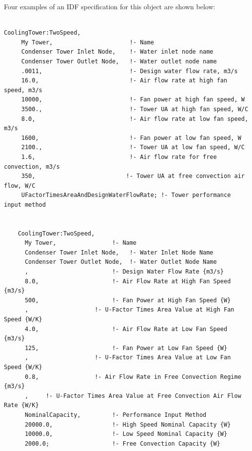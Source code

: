 Four examples of an IDF specification for this object are shown below:

\begin{lstlisting}

CoolingTower:TwoSpeed,
     My Tower,                      !- Name
     Condenser Tower Inlet Node,    !- Water inlet node name
     Condenser Tower Outlet Node,   !- Water outlet node name
     .0011,                         !- Design water flow rate, m3/s
     16.0,                          !- Air flow rate at high fan speed, m3/s
     10000,                         !- Fan power at high fan speed, W
     3500.,                         !- Tower UA at high fan speed, W/C
     8.0,                           !- Air flow rate at low fan speed, m3/s
     1600,                          !- Fan power at low fan speed, W
     2100.,                         !- Tower UA at low fan speed, W/C
     1.6,                           !- Air flow rate for free convection, m3/s
     350,                          !- Tower UA at free convection air flow, W/C
     UFactorTimesAreaAndDesignWaterFlowRate; !- Tower performance input method


    CoolingTower:TwoSpeed,
      My Tower,                !- Name
      Condenser Tower Inlet Node,   !- Water Inlet Node Name
      Condenser Tower Outlet Node,  !- Water Outlet Node Name
      ,                        !- Design Water Flow Rate {m3/s}
      8.0,                     !- Air Flow Rate at High Fan Speed {m3/s}
      500,                     !- Fan Power at High Fan Speed {W}
      ,                   !- U-Factor Times Area Value at High Fan Speed {W/K}
      4.0,                     !- Air Flow Rate at Low Fan Speed {m3/s}
      125,                     !- Fan Power at Low Fan Speed {W}
      ,                   !- U-Factor Times Area Value at Low Fan Speed {W/K}
      0.8,                !- Air Flow Rate in Free Convection Regime {m3/s}
      ,     !- U-Factor Times Area Value at Free Convection Air Flow Rate {W/K}
      NominalCapacity,         !- Performance Input Method
      20000.0,                 !- High Speed Nominal Capacity {W}
      10000.0,                 !- Low Speed Nominal Capacity {W}
      2000.0;                  !- Free Convection Capacity {W}



\end{lstlisting}
